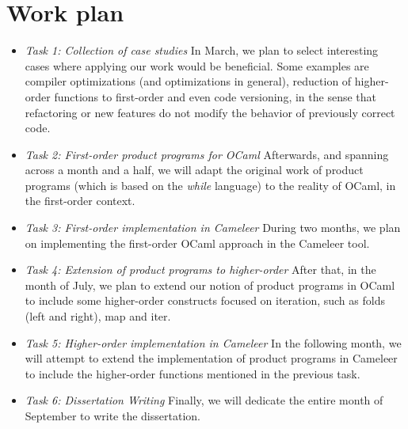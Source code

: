 
%

\chapter{Work plan}
\label{cha:work_plan}

\begin{itemize}
    \setlength\itemsep{0bp}

    \item{\emph{Task 1: Collection of case studies}}\hspace{1em}
    In March, we plan to select interesting cases where applying our work would be beneficial. 
    Some examples are compiler optimizations (and optimizations in general), reduction of higher-order functions to first-order and even code versioning, in the sense that refactoring or new features do not modify the behavior of previously correct code.

    \item \emph{Task 2: First-order product programs for OCaml}\hspace{1em} 
    Afterwards, and spanning across a month and a half, we will adapt the original work of product programs (which is based on the \emph{while} language) to the reality of OCaml, in the first-order context.

    \item \emph{Task 3: First-order implementation in Cameleer}\hspace{1em} 
    During two months, we plan on implementing the first-order OCaml approach in the Cameleer tool.

    \item \emph{Task 4: Extension of product programs to higher-order}\hspace{1em} 
    After that, in the month of July, we plan to extend our notion of product programs in OCaml to include some higher-order constructs focused on iteration, such as folds (left and right), map and iter.

    \item \emph{Task 5: Higher-order implementation in Cameleer}\hspace{1em} 
    In the following month, we will attempt to extend the implementation of product programs in Cameleer to include the higher-order functions mentioned in the previous task.

    \item \emph{Task 6: Dissertation Writing}\hspace{1em} 
    Finally, we will dedicate the entire month of September to write the dissertation.

\end{itemize}
  
